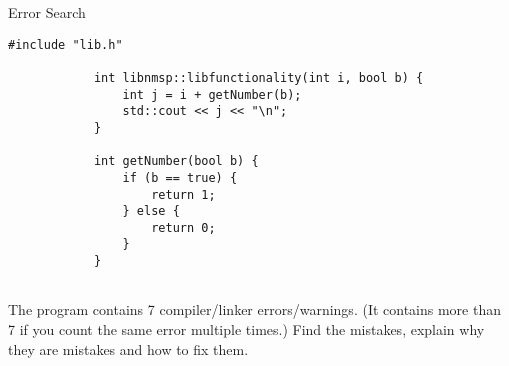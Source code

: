 \documentclass[12pt,a4paper]{scrartcl}
\begin{document}
\begin{aufgabe}[7]{Error Search}
\begin{lstlisting}[gobble=12]
            #include "lib.h"

            int libnmsp::libfunctionality(int i, bool b) {
                int j = i + getNumber(b);
                std::cout << j << "\n";
            }

            int getNumber(bool b) {
                if (b == true) {
                    return 1;
                } else {
                    return 0;
                }
            }
			
		\end{lstlisting}


		The program contains 7 compiler/linker errors/warnings. (It contains more than 7 if you count the same error multiple times.) Find the mistakes, explain why they are mistakes and how to fix them.

\end{aufgabe}

\newpage
\end{document}
